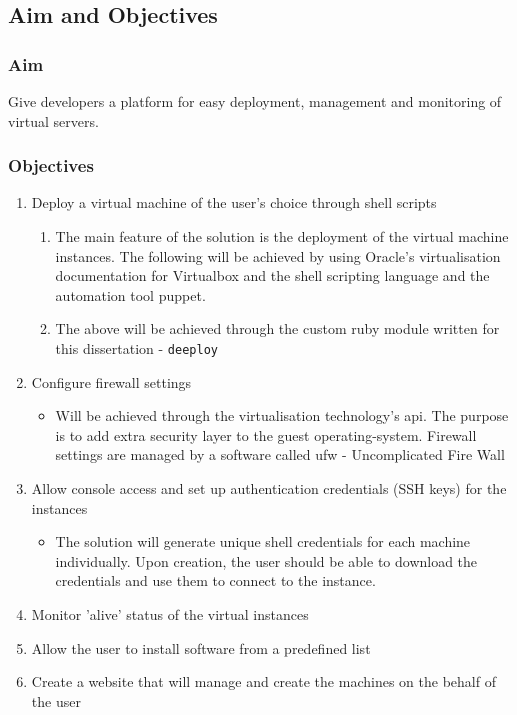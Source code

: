 \documentclass{article}
\begin{document}
\subsection{Aim and Objectives}
\subsubsection{Aim}
Give developers a platform for easy deployment, management and monitoring of virtual servers.
\subsubsection{Objectives}

\begin{enumerate}
    \item Deploy a virtual machine of the user's choice through shell scripts
          \begin{enumerate}
              \item The main feature of the solution is the deployment of the virtual machine instances. The following will be achieved by using Oracle's virtualisation documentation for Virtualbox and the shell scripting language and the automation tool \gls{puppet}.
              \item The above will be achieved through the custom ruby module written for this dissertation - \texttt{deeploy}
          \end{enumerate}

    \item Configure firewall settings
          \begin{itemize}
              \item Will be achieved through the virtualisation technology's \gls{api}. The purpose is to add extra security layer to the guest \gls{operating-system}. Firewall settings are managed by a software called ufw - Uncomplicated Fire Wall
          \end{itemize}

    \item Allow console access and set up authentication credentials (SSH keys) for the instances
          \begin{itemize}
              \item The solution will generate unique shell credentials for each machine individually. Upon creation, the user should be able to download the credentials and use them to connect to the instance.
          \end{itemize}
    \item Monitor 'alive' status of the virtual instances
    \item Allow the user to install software from a predefined list
    \item Create a website that will manage and create the machines on the behalf of the user
\end{enumerate}
\end{document}
